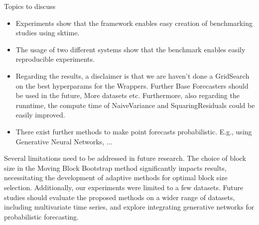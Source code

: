 \documentclass{article}
\begin{document}
Topics to discuss
\begin{itemize}
    \item Experiments show that the framework enables easy creation of benchmarking studies using sktime.
    \item The usage of two different systems show that the benchmark enables easily reproducible experiments.
    \item Regarding the results, a disclaimer is that we are haven't done a GridSearch on the best hyperparams for the Wrappers. Further Base Forecasters should be used in the future, More datasets etc.
    Furthermore, also regarding the runntime, the compute time of NaiveVariance and SquaringResiduals could be easily improved. 
    \item There exist further methods to make point forecasts probabilistic. E.g., using Generative Neural Networks, ...
\end{itemize}



Several limitations need to be addressed in future research. The choice of block size in the Moving Block Bootstrap method significantly impacts results, necessitating the development of adaptive methods for optimal block size selection. Additionally, our experiments were limited to a few datasets. Future studies should evaluate the proposed methods on a wider range of datasets, including multivariate time series, and explore integrating generative networks for probabilistic forecasting.
\end{document}
